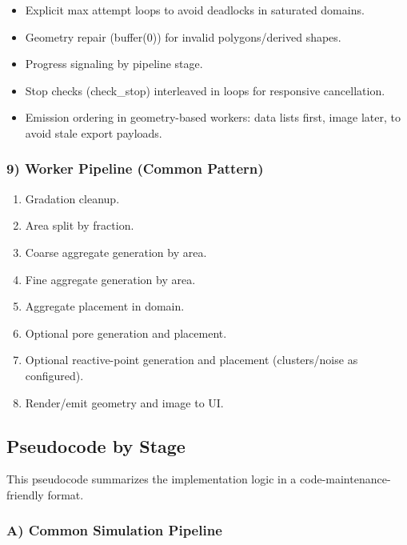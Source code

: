 ﻿\documentclass[11pt,a4paper]{article}
\begin{document}
\begin{itemize}
\item Explicit max attempt loops to avoid deadlocks in saturated domains.
\item Geometry repair (buffer(0)) for invalid polygons/derived shapes.
\item Progress signaling by pipeline stage.
\item Stop checks (check\_stop) interleaved in loops for responsive cancellation.
\item Emission ordering in geometry-based workers: data lists first, image later, to avoid stale export payloads.
\end{itemize}

\subsubsection*{9) Worker Pipeline (Common Pattern)}

\begin{enumerate}
\item Gradation cleanup.
\item Area split by fraction.
\item Coarse aggregate generation by area.
\item Fine aggregate generation by area.
\item Aggregate placement in domain.
\item Optional pore generation and placement.
\item Optional reactive-point generation and placement (clusters/noise as configured).
\item Render/emit geometry and image to UI.
\end{enumerate}

\subsection*{Pseudocode by Stage}

This pseudocode summarizes the implementation logic in a code-maintenance-friendly format.


\subsubsection*{A) Common Simulation Pipeline}
\end{document}
